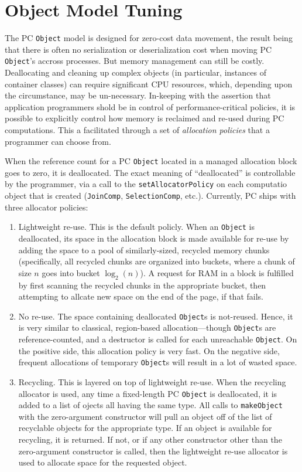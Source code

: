 \section{Object Model Tuning}

\noindent
The PC \texttt{Object} model is designed for zero-cost data movement, the result being that there is often no serialization or deserialization
cost
when moving PC \texttt{Object}'s accross processes.  But memory management can still be costly.  Deallocating and cleaning
up complex objects (in particular, instances of container classes) can require significant CPU resources, which, depending upon the 
circumstance, may be un-necessary.  In-keeping with the assertion that application programmers shold be in
control of performance-critical policies, it is possible to explicitly control how memory is reclaimed and re-used during PC computations.
This a facilitated through a set of \emph{allocation policies} that a programmer can choose from.

When the reference count for a PC \texttt{Object} located in a managed allocation block goes to zero, it is deallocated.  The exact
meaning of ``deallocated'' is controllable by the programmer, via a call to the \texttt{setAllocatorPolicy} on each computatio object
that is created (\texttt{JoinComp}, \texttt{SelectionComp}, etc.).  Currently, PC ships with
three allocator policies:

\begin{enumerate}

\item Lightweight re-use.  This is the default policly.  When an \texttt{Object} is deallocated, its space in the allocation block is made available for re-use by
adding the space to a pool of similarly-sized, recycled memory chunks (specifically, all recycled chunks are organized into buckets, where a chunk of size
$n$ goes into bucket $\log_2 (n)$).  A request for RAM in a block is fulfilled by first scanning the recycled chunks in the appropriate bucket, then
attempting to allcate new space on the end of the page, if that fails.
\item No re-use.  The space containing deallocated \texttt{Object}s is not-reused.  Hence, it is very similar to classical, region-based allocation---though \texttt{Object}s
are reference-counted, and a destructor is called for each unreachable \texttt{Object}.
On the positive side, this allocation policy is very fast.  On the negative side, frequent allocations of temporary \texttt{Object}s will result in a lot of wasted space.
\item Recycling.  This is layered on top of lightweight re-use.  When the recycling allocator is used, any time a fixed-length
PC \texttt{Object} is deallocated, it is
added to a list of ojects all having the same type.  All calls to \texttt{makeObject} with the zero-argument constructor will
pull an object off of the list of recyclable objects for the appropriate type.  
If an object is available for recycling, it is returned.  If not, or if any other constructor other than the zero-argument constructor is called, 
then the lightweight re-use allocator is used to allocate space for the requested
object.

\end{enumerate}


